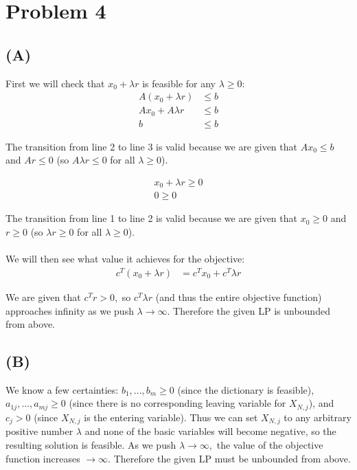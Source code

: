 \documentclass[12pt]{article}
\begin{document}
\newpage
\section*{Problem 4}
\subsection*{(A)}
First we will check that $x_0 + \lambda r$ is feasible for any $\lambda \geq 0$:
\begin{align*}
    A(x_0 + \lambda r) & \leq b \\
    Ax_0 + A \lambda r & \leq b \\
    b & \leq b
\end{align*}

The transition from line 2 to line 3 is valid because we are given that $Ax_0 \leq b$ and $Ar \leq 0$ (so $A\lambda r \leq 0$ for all $\lambda \geq 0$).

\begin{align*}
    x_0 + \lambda r \geq 0 \\
    0 \geq 0
\end{align*}

The transition from line 1 to line 2 is valid because we are given that $x_0 \geq 0$ and $r \geq 0$ (so $\lambda r \geq 0$ for all $\lambda \geq 0$). \\
\\
We will then see what value it achieves for the objective:
\begin{align*}
    c^T (x_0 + \lambda r) &= c^T x_0 + c^T \lambda r
\end{align*}

We are given that $c^T r > 0,$ so $c^T \lambda r$ (and thus the entire objective function) approaches infinity as we push $\lambda \xrightarrow{} \infty$. Therefore the given LP is unbounded from above.

\subsection*{(B)}
We know a few certainties: $b_1, ..., b_m \geq 0$ (since the dictionary is feasible), $a_{1j}, ..., a_{m j} \geq 0$ (since there is no corresponding leaving variable for $X_{N, j}$), and $c_j > 0$ (since $X_{N, j}$ is the entering variable). Thus we can set $X_{N, j}$ to any arbitrary positive number $\lambda$ and none of the basic variables will become negative, so the resulting solution is feasible. As we push $\lambda \xrightarrow{} \infty,$ the value of the objective function increases $\xrightarrow{} \infty$. Therefore the given LP must be unbounded from above.
\end{document}
